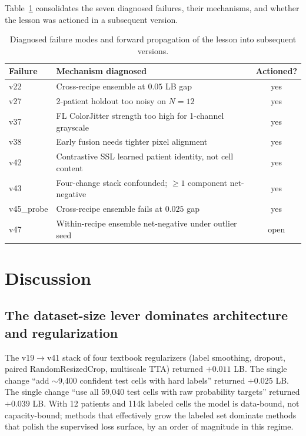 \documentclass[conference]{IEEEtran}
\begin{document}
Table~\ref{tab:failures} consolidates the seven diagnosed failures, their mechanisms, and whether the lesson was actioned in a subsequent version.

\begin{table}[!t]
  \centering
  \caption{Diagnosed failure modes and forward propagation of the lesson into subsequent versions.}
  \label{tab:failures}
  \footnotesize
  \begin{tabular}{@{}lp{4.5cm}c@{}}
    \toprule
    Failure & Mechanism diagnosed & Actioned? \\
    \midrule
    v22 & Cross-recipe ensemble at $0.05$ LB gap & yes \\
    v27 & 2-patient holdout too noisy on $N=12$ & yes \\
    v37 & FL ColorJitter strength too high for 1-channel grayscale & yes \\
    v38 & Early fusion needs tighter pixel alignment & yes \\
    v42 & Contrastive SSL learned patient identity, not cell content & yes \\
    v43 & Four-change stack confounded; $\ge 1$ component net-negative & yes \\
    v45\_probe & Cross-recipe ensemble fails at $0.025$ gap & yes \\
    v47 & Within-recipe ensemble net-negative under outlier seed & open \\
    \bottomrule
  \end{tabular}
\end{table}

\section{Discussion}
\label{sec:discussion}

\subsection{The dataset-size lever dominates architecture and regularization}

The v19$\rightarrow$v41 stack of four textbook regularizers (label smoothing, dropout, paired RandomResizedCrop, multiscale TTA) returned $+0.011$ LB. The single change ``add $\sim$9{,}400 confident test cells with hard labels'' returned $+0.025$ LB. The single change ``use all 59{,}040 test cells with raw probability targets'' returned $+0.039$ LB. With 12 patients and 114k labeled cells the model is data-bound, not capacity-bound; methods that effectively grow the labeled set dominate methods that polish the supervised loss surface, by an order of magnitude in this regime.
\end{document}

